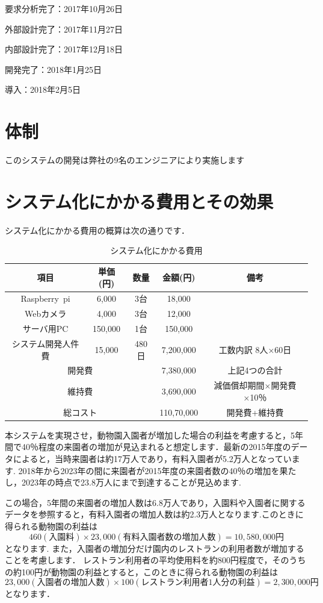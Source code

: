 \documentclass[a4j]{jarticle}
\begin{document}
要求分析完了：2017年10月26日

外部設計完了：2017年11月27日

内部設計完了：2017年12月18日

開発完了：2018年1月25日

導入：2018年2月5日

\section{体制}
このシステムの開発は弊社の9名のエンジニアにより実施します


\section{システム化にかかる費用とその効果}
システム化にかかる費用の概算は次の通りです．
\begin{table}[H]
  \caption{システム化にかかる費用}
  \begin{center}
    \begin{tabular}{|c|c|c|c|c|} \hline
      項目&単価(円)&数量&金額(円)&備考 \\ \hline
      Raspberry~pi&6,000&3台&18,000&　\\ \hline
      Webカメラ&4,000&3台&12,000&　\\ \hline
      サーバ用PC&150,000&1台&150,000&　\\ \hline
      システム開発人件費&15,000&480日&7,200,000&工数内訳 8人×60日 \\ \hline
      \multicolumn{3}{|c|}{開発費}&7,380,000&上記4つの合計 \\ \hline
      \multicolumn{3}{|c|}{維持費}&3,690,000&減価償却期間×開発費×10％ \\ \hline %
      \multicolumn{3}{|c|}{総コスト}&110,70,000&開発費+維持費 \\ \hline
    \end{tabular}
  \end{center}
\end{table}
本システムを実現させ，動物園入園者が増加した場合の利益を考慮すると，5年間で40％程度の来園者の増加が見込まれると想定します．最新の2015年度のデータによると，当時来園者は約17万人であり，有料入園者が5.2万人となっています\cite{ref3}.
2018年から2023年の間に来園者が2015年度の来園者数の40％の増加を果たし，2023年の時点で23.8万人にまで到達することが見込めます.

この場合，5年間の来園者の増加人数は6.8万人であり，入園料や入園者に関するデータ\cite{ref2}\cite{ref3}を参照すると，有料入園者の増加人数は約2.3万人となります.このときに得られる動物園の利益は
\[460(入園料) \times 23,000(有料入園者数の増加人数) = 10,580,000円\]
となります.
また，入園者の増加分だけ園内のレストランの利用者数が増加することを考慮します．
レストラン利用者の平均使用料を約800円程度で，そのうちの約100円が動物園の利益とすると，このときに得られる動物園の利益は
\[23,000(入園者の増加人数) \times 100(レストラン利用者1人分の利益) = 2,300,000円\]
となります．
\end{document}
